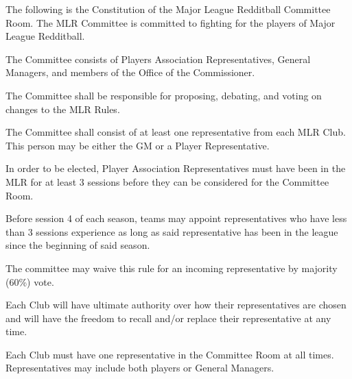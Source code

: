 

The following is the Constitution of the Major League Redditball Committee Room. The MLR Committee is committed to fighting for the players of Major League Redditball.

\begin{deepEnumerate}
    \item The Committee consists of Players Association Representatives, General Managers, and members of the Office of the Commissioner.
\end{deepEnumerate}
    
\begin{deepEnumerate}
    \item The Committee shall be responsible for proposing, debating, and voting on changes to the MLR Rules.
    \item The Committee shall consist of at least one representative from each MLR Club. This person may be either the GM or a Player Representative.
    \begin{deepEnumerate}
        \item In order to be elected, Player Association Representatives must have been in the MLR for at least 3 sessions before they can be considered for the Committee Room.
        \begin{deepEnumerate}
            \item Before session 4 of each season, teams may appoint representatives who have less than 3 sessions experience as long as said representative 
            has been in the league since the beginning of said season.
            \item The committee may waive this rule for an incoming representative by majority (60\%) vote.
        \end{deepEnumerate}
    \end{deepEnumerate}
    \item Each Club will have ultimate authority over how their representatives are chosen and will have the freedom to recall and/or replace their representative at any time.
    \item Each Club must have one representative in the Committee Room at all times. Representatives may include both players or General Managers.
    \begin{deepEnumerate}

\end{deepEnumerate}
\end{deepEnumerate}
